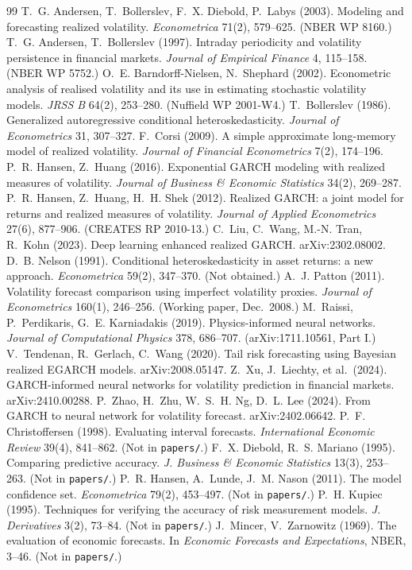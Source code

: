 \documentclass[11pt]{article}
\begin{document}
\begin{thebibliography}{99}
 T.~G. Andersen, T.~Bollerslev, F.~X. Diebold, P.~Labys (2003).
Modeling and forecasting realized volatility. \emph{Econometrica} 71(2), 579--625. (NBER WP 8160.)
 T.~G. Andersen, T.~Bollerslev (1997). Intraday periodicity and volatility
persistence in financial markets. \emph{Journal of Empirical Finance} 4, 115--158. (NBER WP 5752.)
 O.~E. Barndorff-Nielsen, N.~Shephard (2002). Econometric analysis of
realised volatility and its use in estimating stochastic volatility models. \emph{JRSS B}
64(2), 253--280. (Nuffield WP 2001-W4.)
 T.~Bollerslev (1986). Generalized autoregressive conditional
heteroskedasticity. \emph{Journal of Econometrics} 31, 307--327.
 F.~Corsi (2009). A simple approximate long-memory model of realized
volatility. \emph{Journal of Financial Econometrics} 7(2), 174--196.
 P.~R. Hansen, Z.~Huang (2016). Exponential GARCH modeling with realized
measures of volatility. \emph{Journal of Business \& Economic Statistics} 34(2), 269--287.
 P.~R. Hansen, Z.~Huang, H.~H. Shek (2012). Realized GARCH: a joint model for
returns and realized measures of volatility. \emph{Journal of Applied Econometrics} 27(6),
877--906. (CREATES RP 2010-13.)
 C.~Liu, C.~Wang, M.-N. Tran, R.~Kohn (2023). Deep learning enhanced
realized GARCH. arXiv:2302.08002.
 D.~B. Nelson (1991). Conditional heteroskedasticity in asset returns: a
new approach. \emph{Econometrica} 59(2), 347--370. (Not obtained.)
 A.~J. Patton (2011). Volatility forecast comparison using imperfect
volatility proxies. \emph{Journal of Econometrics} 160(1), 246--256. (Working paper, Dec.\ 2008.)
 M.~Raissi, P.~Perdikaris, G.~E. Karniadakis (2019). Physics-informed
neural networks. \emph{Journal of Computational Physics} 378, 686--707. (arXiv:1711.10561, Part I.)
 V.~Tendenan, R.~Gerlach, C.~Wang (2020). Tail risk forecasting using
Bayesian realized EGARCH models. arXiv:2008.05147.
 Z.~Xu, J.~Liechty, et al.\ (2024). GARCH-informed neural networks for
volatility prediction in financial markets. arXiv:2410.00288.
 P.~Zhao, H.~Zhu, W.~S.~H. Ng, D.~L. Lee (2024). From GARCH to neural
network for volatility forecast. arXiv:2402.06642.
 P.~F. Christoffersen (1998). Evaluating interval forecasts. \emph{International Economic Review} 39(4), 841--862. (Not in \texttt{papers/}.)
 F.~X. Diebold, R.~S. Mariano (1995). Comparing predictive accuracy. \emph{J. Business \& Economic Statistics} 13(3), 253--263. (Not in \texttt{papers/}.)
 P.~R. Hansen, A.~Lunde, J.~M. Nason (2011). The model confidence set. \emph{Econometrica} 79(2), 453--497. (Not in \texttt{papers/}.)
 P.~H. Kupiec (1995). Techniques for verifying the accuracy of risk measurement models. \emph{J. Derivatives} 3(2), 73--84. (Not in \texttt{papers/}.)
 J.~Mincer, V.~Zarnowitz (1969). The evaluation of economic forecasts. In \emph{Economic Forecasts and Expectations}, NBER, 3--46. (Not in \texttt{papers/}.)
\end{thebibliography}
\end{document}
